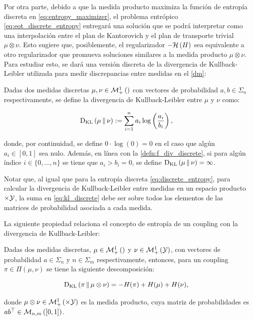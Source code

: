 Por otra parte, debido a que la medida producto maximiza la función de entropía discreta en \eqref{eq:entropy_maximizer}, el problema entrópico \eqref{eq:eot_discrete_entropy} entregará una solución que se podrá interpretar como una interpolación entre el plan de Kantorovich y el plan de transporte trivial $\mu\otimes\nu$. Esto sugiere que, posiblemente, el regularizador $-\mathcal{H}\left(H\right)$ sea equivalente a otro regularizador que promueva soluciones similares a la medida producto $\mu\otimes\nu$. Para estudiar esto, se dará una versión discreta de la divergencia de Kullback-Leibler utilizada para medir discrepancias entre medidas en el \autoref{dm}:

\begin{defn}
	Dadas dos medidas discretas $\mu,\nu \in\mathcal{M}_+^1\left(\right)$ con vectores de probabilidad $a,b\in\Sigma_n$ respectivamente, se define la divergencia de Kullback-Leibler entre $\mu$ y $\nu$ como:

	\begin{equation}
		\label{eq:kl_discrete}
		\operatorname{D_{KL}}\left(\mu\,\|\,\nu\right) := \sum_{i=1}^{n} a_i\log\left(\frac{a_i}{b_i}\right),
	\end{equation}

	donde, por continuidad, se define $0\cdot\log(0)=0$ en el caso que algún $a_i\in[0,1]$ sea nulo. Además, en línea con la \autoref{defn:f_div_discrete}, si para algún índice $i\in\{0,\ldots,n\}$ se tiene que $a_i>b_i=0$, se define $\operatorname{D_{KL}}\left(\mu\,\|\,\nu\right)=\infty$.

\end{defn}

Notar que, al igual que para la entropía discreta \eqref{eq:discrete_entropy}, para calcular la divergencia de Kullback-Leibler entre medidas en un espacio producto $\times\mathcal{Y}$, la suma en \eqref{eq:kl_discrete} debe ser sobre todos los elementos de las matrices de probabilidad asociada a cada medida.

La siguiente propiedad relaciona el concepto de entropía de un coupling con la divergencia de Kullback-Leibler:

\begin{prop}
	Dadas dos medidas discretas, $\mu\in\mathcal{M}_+^1\left(\right)$ y $\nu\in\mathcal{M}_+^1\left(\mathcal{Y}\right)$, con vectores de probabilidad $a\in\Sigma_n$ y $n\in\Sigma_m$ respectivamente, entonces, para un coupling $\pi\in\Pi(\mu,\nu)$ se tiene la siguiente descomposición:

	\begin{equation*}
		\operatorname{D_{KL}}\left(\pi\,\|\,\mu\otimes\nu\right) = -H(\pi) + H(\mu) + H(\nu),
	\end{equation*}

	donde $\mu\otimes\nu\in\probmeasure{\xspace\times\yspace}$ es la medida producto, cuya matriz de probabilidades es $ab^\top\in\mathcal{M}_{n,m}\left([0,1]\right)$.
\end{prop}

